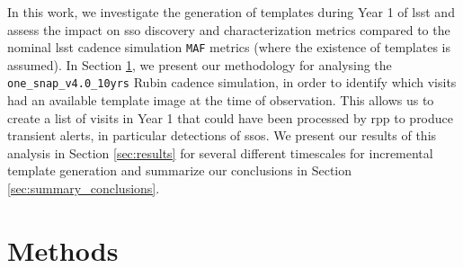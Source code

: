 \documentclass[preprintm,linenumbers]{aastex631}
\newcommand{\baselinefull}{\texttt{one\_snap\_v4.0\_10yrs}\xspace}
\newcommand{\maf}{\texttt{MAF}\xspace}
\begin{document}
 In this work, we investigate the generation of templates during Year 1 of \gls*{lsst} and assess the impact on \gls*{sso} discovery and characterization metrics compared to the nominal \gls*{lsst} cadence simulation \maf metrics  (where the existence of templates is assumed). 
 In Section \ref{sec:methods}, we present our methodology for analysing the \baselinefull Rubin cadence simulation, %
 in order to identify which visits had an available template image at the time of observation.
 This allows us to create a list of visits in Year 1 that could have been processed by \gls*{rpp} to produce transient alerts, in particular detections of \glspl*{sso}.
 We present our results of this analysis in Section \ref{sec:results} for several different timescales for incremental template generation and summarize our conclusions in Section \ref{sec:summary_conclusions}.  
	
	\section{Methods}
	\label{sec:methods}
\end{document}

